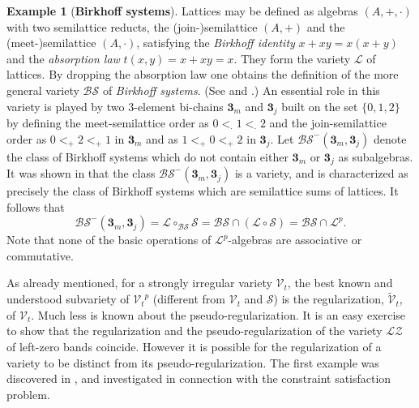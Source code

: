 \documentclass{birkau}
\def\mbf{\mathbf}
\newcommand{\mc}{\mathcal}
\newcommand{\mcV}{\mathcal{V}}
\newcommand{\mcS}{\mathcal{S}}
\def\tV{\widetilde{\mcV}}
\def\mbf{\mathbf}
\newcommand{\pro}[1]{{#1}^p}
\theoremstyle{plain}
\theoremstyle{definition}
\newtheorem{example}[theorem]{Example}
\numberwithin{equation}{section}
\begin{document}
\begin{example} [\textbf{Birkhoff systems}]\label{ex:birkhoff}
Lattices may be defined as algebras $(A,+,\cdot)$ with two semilattice reducts, the
(join-)semilattice $(A,+)$ and the (meet-)semilattice $(A, \cdot)$, satisfying the
\emph{Birkhoff identity} $x + xy = x(x+y)$ and the \emph{absorption law} $t(x,y) = x + xy
= x$. They form the variety $\mc{L}$ of lattices. By dropping the absorption law one
obtains the definition of the more general variety $\mc{BS}$ of \emph{Birkhoff
  systems}. (See \cite{HR17a} and \cite{HR17b}.) An essential role in this variety is
played by two $3$-element bi-chains $\mbf{3}_m$ and $\mbf{3}_j$ built on the set $\{0, 1,
2\}$ by defining the meet-semilattice order as $0 <_{\cdot} 1 <_{\cdot} 2$ and the
join-semilattice order as $0 <_{+} 2 <_{+} 1$ in $\mbf{3}_m$ and as $1 <_+ 0 <_+ 2$ in
$\mbf{3}_j$. Let $\mc{BS}^-(\mbf3_m,\mbf3_j)$ denote the class of Birkhoff systems which do not
contain either $\mbf 3_m$ or $\mbf 3_j$ as subalgebras.
It was shown in \cite{HR17b} that the class $\mc{BS}^-(\mbf3_{m},\mbf3_{j})$ is
a variety, and is characterized as precisely the class of Birkhoff systems which are
semilattice sums of lattices. It follows that
\begin{equation*}
\mc{BS}^-(\mbf3_{m},\mbf3_{j}) = \mc{L} \circ_{\mc{BS}} \mcS = \mc{BS} \cap (\mc{L} \circ \mcS) =
\mc{BS} \cap \pro{\mc{L}}.
\end{equation*}
Note that none of the basic operations of $\pro{\mc{L}}$-algebras are associative or commutative.
\end{example}

As already mentioned, for a strongly irregular variety $\mcV_t$, the best known
and understood subvariety of $\pro{\mcV_t}$ (different from $\mcV_t$ and $\mcS$) is the
regularization, $\tV_t$, of $\mcV_t$. Much less is known about the pseudo-regularization. It
is an easy exercise to show that the regularization and the pseudo-regularization of the
variety $\mc{LZ}$ of left-zero bands coincide. However it is possible for the
regularization of a variety to be distinct from its pseudo-regularization. The first
example was discovered in \cite{BF15}, and investigated in connection with the constraint
satisfaction problem.
\end{document}

